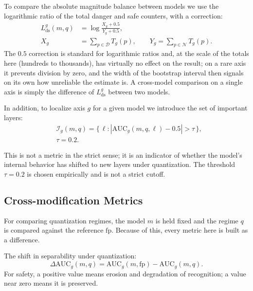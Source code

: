 \documentclass[10pt,twocolumn]{article}
\newcommand{\Dset}{\mathcal{D}}
\newcommand{\Nset}{\mathcal{N}}
\newcommand{\fp}{\mathrm{fp}}
\newcommand{\AUC}{\mathrm{AUC}}
\newcommand{\Lds}{L_{\mathrm{ds}}}
\begin{document}
To compare the absolute magnitude balance between models we use the logarithmic ratio of the total danger and safe counters, with a correction:
\begin{equation}
\begin{aligned}
\Lds^{g}(m,q)
  &= \log\frac{X_g+0.5}{Y_g+0.5}, \\
X_g
  &= \sum_{p\in\Dset} T_g(p),
  \qquad
Y_g
  = \sum_{p\in\Nset} T_g(p).
\end{aligned}
\label{eq:lds}
\end{equation}
The $0.5$ correction is standard for logarithmic ratios and, at the scale of the totals here (hundreds to thousands), has virtually no effect on the result; on a rare axis it prevents division by zero,
and the width of the bootstrap interval then signals on its own how unreliable the estimate is. A cross-model
comparison on a single axis is simply the difference of $\Lds^{g}$ between two models.

In addition, to localize axis $g$ for a given model we introduce the set of important layers:
\begin{equation}
\begin{aligned}
&\mathcal{I}_g(m,q) = \big\{\, \ell : |\AUC_g(m,q,\ell) - 0.5| > \tau \,\big\}, \\
&\tau = 0.2.
\label{eq:important-layers}
\end{aligned}
\end{equation}

This is not a metric in the strict sense; it is an indicator of whether the model's internal behavior has shifted to new layers under quantization. The threshold $\tau = 0.2$ is chosen empirically and is not a strict cutoff.

\subsection{Cross-modification Metrics}
\label{sec:cross-quant}

For comparing quantization regimes, the model $m$ is held fixed and the regime $q$ is compared against the reference $\fp$. Because of this, every metric here is built as a difference.

The shift in separability under quantization:
\begin{equation}
\Delta\AUC_g(m,q) = \AUC_g(m,\fp) - \AUC_g(m,q).
\label{eq:delta-auc}
\end{equation}
For safety, a positive value means erosion and degradation of recognition; a value near zero means it is preserved.
\end{document}
